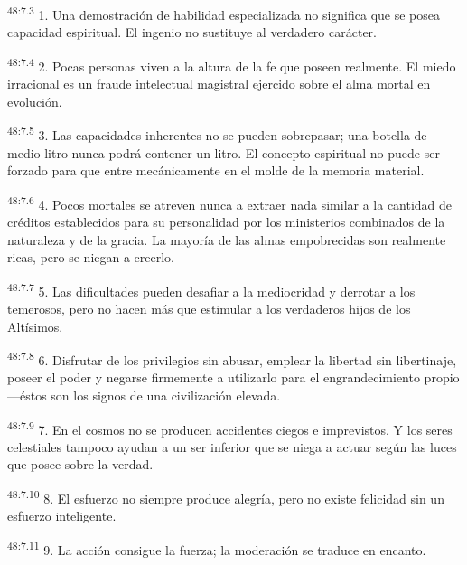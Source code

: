 \par
\textsuperscript{48:7.3} 1. Una demostración de habilidad especializada no significa que se posea capacidad espiritual. El ingenio no sustituye al verdadero carácter.

\par
\textsuperscript{48:7.4} 2. Pocas personas viven a la altura de la fe que poseen realmente. El miedo irracional es un fraude intelectual magistral ejercido sobre el alma mortal en evolución.

\par
\textsuperscript{48:7.5} 3. Las capacidades inherentes no se pueden sobrepasar; una botella de medio litro nunca podrá contener un litro. El concepto espiritual no puede ser forzado para que entre mecánicamente en el molde de la memoria material.

\par
\textsuperscript{48:7.6} 4. Pocos mortales se atreven nunca a extraer nada similar a la cantidad de créditos establecidos para su personalidad por los ministerios combinados de la naturaleza y de la gracia. La mayoría de las almas empobrecidas son realmente ricas, pero se niegan a creerlo.

\par
\textsuperscript{48:7.7} 5. Las dificultades pueden desafiar a la mediocridad y derrotar a los temerosos, pero no hacen más que estimular a los verdaderos hijos de los Altísimos.

\par
\textsuperscript{48:7.8} 6. Disfrutar de los privilegios sin abusar, emplear la libertad sin libertinaje, poseer el poder y negarse firmemente a utilizarlo para el engrandecimiento propio ---éstos son los signos de una civilización elevada.

\par
\textsuperscript{48:7.9} 7. En el cosmos no se producen accidentes ciegos e imprevistos. Y los seres celestiales tampoco ayudan a un ser inferior que se niega a actuar según las luces que posee sobre la verdad.

\par
\textsuperscript{48:7.10} 8. El esfuerzo no siempre produce alegría, pero no existe felicidad sin un esfuerzo inteligente.

\par
\textsuperscript{48:7.11} 9. La acción consigue la fuerza; la moderación se traduce en encanto.

